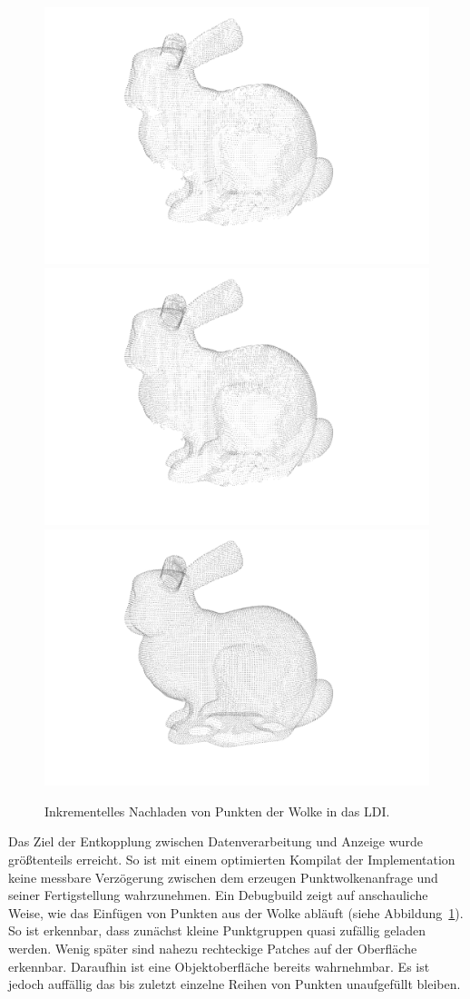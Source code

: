 \documentclass[hyperref, beleg, german]{cgvpub}
\begin{document}
\begin{figure}
	\includegraphics[width = .48\linewidth]{images/incrementalLoading/107}
	\includegraphics[width = .48\linewidth]{images/incrementalLoading/109}%
	\includegraphics[width = .48\linewidth]{images/incrementalLoading/115}
	\caption{Inkrementelles Nachladen von Punkten der Wolke in das LDI.}%
	\label{img:incload}
\end{figure}

Das Ziel der Entkopplung zwischen Datenverarbeitung und Anzeige wurde
größtenteils erreicht. So ist mit einem optimierten Kompilat der Implementation
keine messbare Verzögerung zwischen dem erzeugen Punktwolkenanfrage und seiner
Fertigstellung wahrzunehmen. Ein Debugbuild zeigt auf anschauliche Weise, wie
das Einfügen von Punkten aus der Wolke abläuft (siehe
Abbildung~\ref{img:incload}). So ist erkennbar, dass zunächst kleine
Punktgruppen quasi zufällig geladen werden. Wenig später sind nahezu
rechteckige Patches auf der Oberfläche erkennbar. Daraufhin ist eine
Objektoberfläche bereits wahrnehmbar. Es ist jedoch auffällig das bis zuletzt
einzelne Reihen von Punkten unaufgefüllt bleiben.
\end{document}
